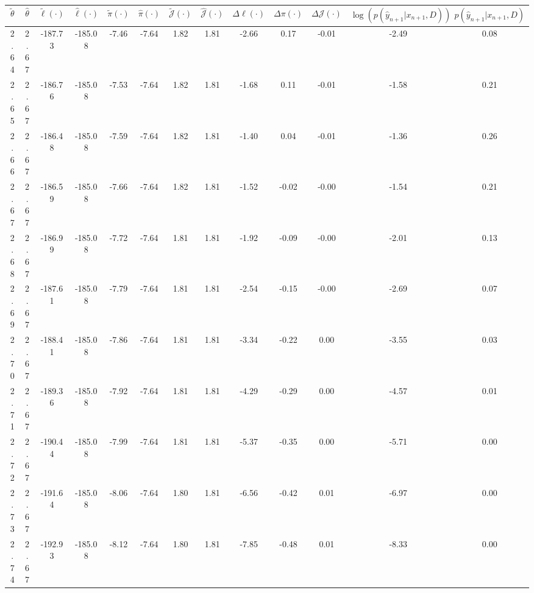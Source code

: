 \begin{table}[htbp]
        \centering
        \tiny
        \begin{adjustbox}{angle=90}
            \begin{tabular}{|c|c|c|c|c|c|c|c|c|c|c|c|c|}
                \hline
                 $\tilde{\theta}$ & $\hat{\theta}$ & $\tilde{\ell}(\cdot)$ & $\hat{\ell}(\cdot)$ & $\tilde{\pi}(\cdot)$ & $\hat{\pi}(\cdot)$ & $\tilde{\mathcal{J}}(\cdot)$ & $\hat{\mathcal{J}}(\cdot)$ & $\Delta \ell(\cdot)$ & $\Delta \pi(\cdot)$ & $\Delta \mathcal{J}(\cdot)$ & $\log(p(\hat{y}_{n+1}|x_{n+1}, D))$ & $p(\hat{y}_{n+1}|x_{n+1}, D)$ \\
                \hline
                 2.64 & 2.67 & -187.73 & -185.08 & -7.46 & -7.64 & 1.82 & 1.81 & -2.66 & 0.17 & -0.01 & -2.49 & 0.08\\ \hline
 2.65 & 2.67 & -186.76 & -185.08 & -7.53 & -7.64 & 1.82 & 1.81 & -1.68 & 0.11 & -0.01 & -1.58 & 0.21\\ \hline
 2.66 & 2.67 & -186.48 & -185.08 & -7.59 & -7.64 & 1.82 & 1.81 & -1.40 & 0.04 & -0.01 & -1.36 & 0.26\\ \hline
 2.67 & 2.67 & -186.59 & -185.08 & -7.66 & -7.64 & 1.82 & 1.81 & -1.52 & -0.02 & -0.00 & -1.54 & 0.21\\ \hline
 2.68 & 2.67 & -186.99 & -185.08 & -7.72 & -7.64 & 1.81 & 1.81 & -1.92 & -0.09 & -0.00 & -2.01 & 0.13\\ \hline
 2.69 & 2.67 & -187.61 & -185.08 & -7.79 & -7.64 & 1.81 & 1.81 & -2.54 & -0.15 & -0.00 & -2.69 & 0.07\\ \hline
 2.70 & 2.67 & -188.41 & -185.08 & -7.86 & -7.64 & 1.81 & 1.81 & -3.34 & -0.22 & 0.00 & -3.55 & 0.03\\ \hline
 2.71 & 2.67 & -189.36 & -185.08 & -7.92 & -7.64 & 1.81 & 1.81 & -4.29 & -0.29 & 0.00 & -4.57 & 0.01\\ \hline
 2.72 & 2.67 & -190.44 & -185.08 & -7.99 & -7.64 & 1.81 & 1.81 & -5.37 & -0.35 & 0.00 & -5.71 & 0.00\\ \hline
 2.73 & 2.67 & -191.64 & -185.08 & -8.06 & -7.64 & 1.80 & 1.81 & -6.56 & -0.42 & 0.01 & -6.97 & 0.00\\ \hline
 2.74 & 2.67 & -192.93 & -185.08 & -8.12 & -7.64 & 1.80 & 1.81 & -7.85 & -0.48 & 0.01 & -8.33 & 0.00\\ \hline
            \end{tabular}
        \end{adjustbox}
        \caption{}
        \label{}
    \end{table}
    
